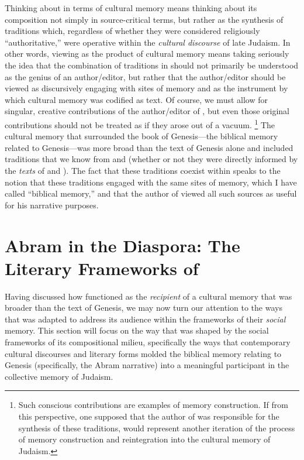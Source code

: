Thinking about \ga in terms of cultural memory means thinking about its composition not simply in source-critical terms, but rather as the synthesis of traditions which, regardless of whether they were considered religiously ``authoritative,'' were operative within the \emph{cultural discourse} of late \secondtemple Judaism. In other words, viewing \ga as the product of cultural memory means taking seriously the idea that the combination of traditions in \ga should not primarily be understood as the genius of an author/editor, but rather that the author/editor should be viewed as discursively engaging with sites of memory and as the instrument by which cultural memory was codified as text. Of course, we must allow for singular, creative contributions of the author/editor of \ga, but even those original contributions should not be treated as if they arose out of a vacuum.%
    \footnote{Such conscious contributions are examples of memory construction. If from this perspective, one supposed that the author of \ga was responsible for the synthesis of these traditions, \ga would represent another iteration of the process of memory construction and reintegration into the cultural memory of \secondtemple Judaism.}
The cultural memory that surrounded the book of Genesis---the biblical memory related to Genesis---was more broad than the text of Genesis alone and included traditions that we know from \jub and \firstenoch (whether or not they were directly informed by the \emph{texts} of \jub and \firstenoch). The fact that these traditions coexist within \ga speaks to the notion that these traditions engaged with the same sites of memory, which I have called ``biblical memory,'' and that the author of \ga viewed all such sources as useful for his narrative purposes.

\section{Abram in the Diaspora: The Literary Frameworks of \GA}

Having discussed how \ga functioned as the \emph{recipient} of a cultural memory that was broader than the text of Genesis, we may now turn our attention to the ways that \ga was adapted to address its audience within the frameworks of their \emph{social} memory. This section will focus on the way that \ga was shaped by the social frameworks of its compositional milieu, specifically the ways that contemporary cultural discourses and literary forms molded the biblical memory relating to Genesis (specifically, the Abram narrative) into a meaningful participant in the collective memory of \secondtemple Judaism.

